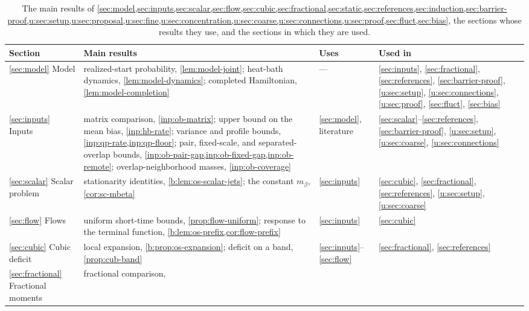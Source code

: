 \begin{table}[!t]
\centering
\scriptsize
\caption{The main results of
\cref{sec:model,sec:inputs,sec:scalar,sec:flow,sec:cubic,sec:fractional,sec:static,sec:references,sec:induction,sec:barrier-proof,u:sec:setup,u:sec:proposal,u:sec:fine,u:sec:concentration,u:sec:coarse,u:sec:connections,u:sec:proof,sec:fluct,sec:bias},
the sections whose results they use, and the sections in which they are used.
}\label{tab:ov-dependencies}
\begin{tabular}{@{}>{\raggedright\arraybackslash}p{}>{\raggedright\arraybackslash}p{}>{\raggedright\arraybackslash}p{}>{\raggedright\arraybackslash}p{}@{}}
\toprule
Section & Main results & Uses & Used in\\
\midrule
\ref{sec:model} Model & realized-start probability, \cref{lem:model-joint};
 heat-bath dynamics, \cref{lem:model-dynamics}; completed Hamiltonian,
 \cref{lem:model-completion} & --- & \ref{sec:inputs}, \ref{sec:fractional},
 \ref{sec:references}, \ref{sec:barrier-proof}, \ref{u:sec:setup},
 \ref{u:sec:connections}, \ref{u:sec:proof}, \ref{sec:fluct}, \ref{sec:bias}\\
\ref{sec:inputs} Inputs & matrix comparison, \cref{inp:ob-matrix}; upper
 bound on the mean bias, \cref{inp:hb-rate}; variance and profile bounds,
 \cref{inp:qp-rate,inp:qp-floor}; pair, fixed-scale, and separated-overlap bounds,
 \cref{inp:ob-pair-gap,inp:ob-fixed-gap,inp:ob-remote}; overlap-neighborhood
 masses, \cref{inp:ob-coverage} & \ref{sec:model}, literature &
 \ref{sec:scalar}--\ref{sec:references}, \ref{sec:barrier-proof},
 \ref{u:sec:setup}, \ref{u:sec:coarse}, \ref{u:sec:connections}\\
\ref{sec:scalar} Scalar problem & stationarity identities, \cref{b:lem:os-scalar-jets};
 the constant $m_\beta$, \cref{cor:sc-mbeta} & \ref{sec:inputs} & \ref{sec:cubic},
 \ref{sec:fractional}, \ref{sec:references}, \ref{u:sec:setup},
 \ref{u:sec:coarse}\\
\ref{sec:flow} Flows & uniform short-time bounds, \cref{prop:flow-uniform};
 response to the terminal function, \cref{b:lem:os-prefix,cor:flow-prefix} &
 \ref{sec:inputs} & \ref{sec:cubic}\\
\ref{sec:cubic} Cubic deficit & local expansion, \cref{b:prop:os-expansion};
 deficit on a band, \cref{prop:cub-band} & \ref{sec:inputs}--\ref{sec:flow} & \ref{sec:fractional}, \ref{sec:references}\\
\ref{sec:fractional} Fractional moments & fractional comparison,

\end{tabular}
\end{table}
